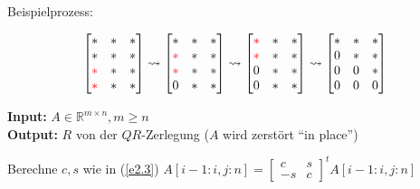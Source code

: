 \documentclass{book}
\def\R{\mathbb{R}}
\begin{document}
            Beispielprozess:

            \[
            \begin{bmatrix}
                * & * & * \\
                * & * & * \\
                \color{red}* & * & * \\
                \color{red}* & * & * \\
            \end{bmatrix}
            \rightsquigarrow
            \begin{bmatrix}
                * & * & * \\
                \color{red}* & * & * \\
                \color{red}* & * & * \\
                0 & * & * \\
            \end{bmatrix}
            \rightsquigarrow
            \begin{bmatrix}
                \color{red}* & * & * \\
                \color{red}* & * & * \\
                0 & * & * \\
                0 & * & * \\
            \end{bmatrix}
            \rightsquigarrow
            \begin{bmatrix}
                * & * & * \\
                0 & * & * \\
                0 & 0 & * \\
                0 & 0 & 0 \\
            \end{bmatrix}
            \]

            \begin{algorithm}[H]
                \caption{}\label{a2.13}
                \textbf{Input:} $A\in\R^{m\times n},m\geq n$\\
                \textbf{Output:} $R$ von der $QR$-Zerlegung ($A$ wird zerstört ``in place'')
                \begin{algorithmic}
                        \State Berechne $c,s$ wie in (\ref{e2.3})
                        \State $A[i-1:i,j:n]=\begin{bmatrix}
                            c & s \\
                            -s & c 
                        \end{bmatrix}^t A[i-1:i,j:n]$
                    \EndFor
                \EndFor
                \end{algorithmic}
            \end{algorithm}
\end{document}
